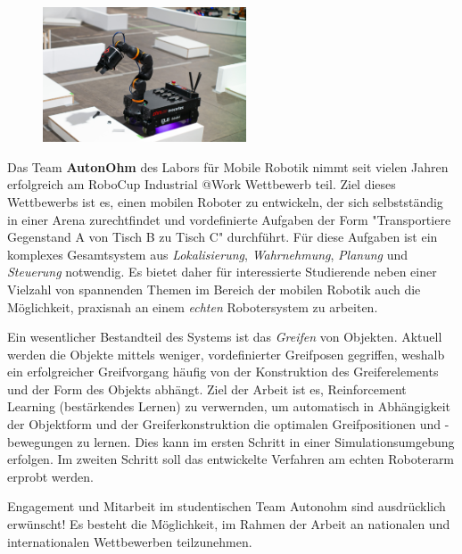 \documentclass{ohm_project_description}
\begin{document}
\maketitle
\thispagestyle{fancy}

\vspace*{-2.5cm}
\begin{figure}[h!]
    \centering
    \includegraphics[height=4cm]{img/atwork.jpg}
\end{figure} 


Das Team \textbf{AutonOhm} des Labors für Mobile Robotik nimmt seit vielen Jahren erfolgreich am RoboCup Industrial @Work Wettbewerb teil. Ziel dieses Wettbewerbs ist es, einen mobilen Roboter zu entwickeln, der sich selbstständig in einer Arena zurechtfindet und vordefinierte Aufgaben der Form "Transportiere Gegenstand A von Tisch B zu Tisch C" durchführt. Für diese Aufgaben ist ein komplexes Gesamtsystem aus \emph{Lokalisierung}, \emph{Wahrnehmung}, \emph{Planung} und \emph{Steuerung} notwendig. Es bietet daher für interessierte Studierende neben einer Vielzahl von spannenden Themen im Bereich der mobilen Robotik auch die Möglichkeit, praxisnah an einem \emph{echten} Robotersystem zu arbeiten.

Ein wesentlicher Bestandteil des Systems ist das \emph{Greifen} von Objekten. Aktuell werden die Objekte mittels weniger, vordefinierter Greifposen gegriffen, weshalb ein erfolgreicher Greifvorgang häufig von der Konstruktion des Greiferelements und der Form des Objekts abhängt. Ziel der Arbeit ist es, Reinforcement Learning (bestärkendes Lernen) zu verwernden, um automatisch in Abhängigkeit der Objektform und der Greiferkonstruktion die optimalen Greifpositionen und -bewegungen zu lernen. Dies kann im ersten Schritt in einer Simulationsumgebung erfolgen. Im zweiten Schritt soll das entwickelte Verfahren am echten Roboterarm erprobt werden. 

Engagement und Mitarbeit im studentischen Team Autonohm sind ausdrücklich erwünscht! Es besteht die Möglichkeit, im Rahmen der Arbeit an nationalen und internationalen Wettbewerben teilzunehmen.
\end{document}
